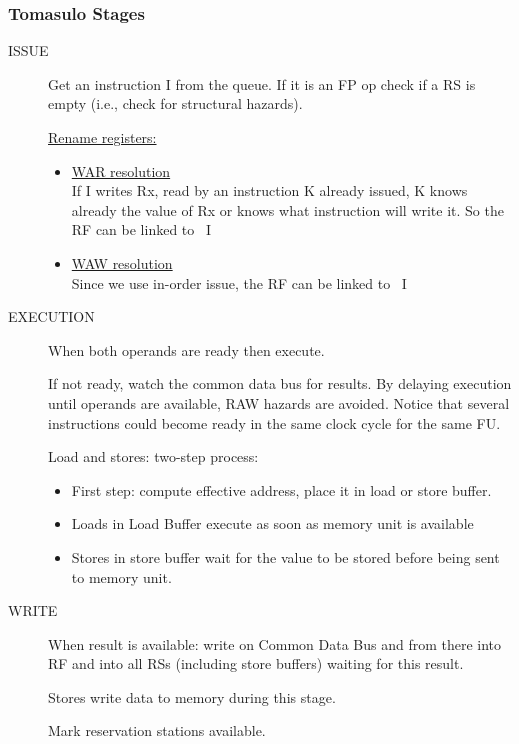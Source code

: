 \subsubsection{Tomasulo Stages}
\begin{description}
    \item[ISSUE] Get an instruction I from the queue.
    If it is an FP op check if a RS is empty (i.e., check for structural hazards).

    \underline{Rename registers:}
    \begin{itemize}
        \item[] \underline{WAR resolution}\\
    If I writes Rx, read by an instruction K already issued, K
    knows already the value of Rx or knows what instruction
    will write it.
    So the RF can be linked to~ I
        \item[] \underline{WAW resolution}\\
    Since we use in-order issue, the RF can be linked to~ I
    \end{itemize}



    \item[EXECUTION] When both operands are ready then execute.

    If not ready, watch the common data bus for results.
    By delaying execution until operands are available, RAW
    hazards are avoided.
    Notice that several instructions could become ready in the
    same clock cycle for the same FU\@.

    Load and stores: two-step process:
    \begin{itemize}[noitemsep]
        \item First step: compute effective address, place it in load or
        store buffer.
        \item Loads in Load Buffer execute as soon as memory unit is
    available
        \item Stores in store buffer wait for the value to be stored before
    being sent to memory unit.
    \end{itemize}

    \item[WRITE] When result is available: write on Common Data Bus and from there into RF and into all RSs
    (including store buffers) waiting for this result.

    Stores write data to memory during this stage.

    Mark reservation stations available.
\end{description}

